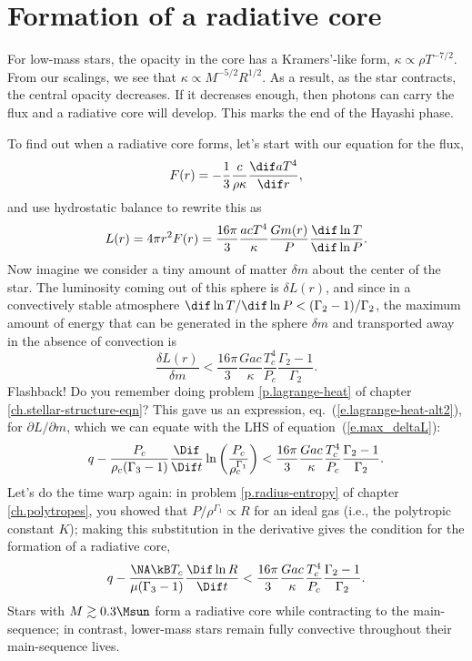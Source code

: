 \section{Formation of a radiative core}

For low-mass stars, the opacity in the core has a Kramers'-like form, $\kappa \propto \rho T^{-7/2}$. From our scalings, we see that $\kappa \propto M^{-5/2} R^{1/2}$.  As a result, as the star contracts, the central opacity decreases.  If it decreases enough, then photons can carry the flux and a radiative core will develop.
This marks the end of the Hayashi phase.

To find out when a radiative core forms, let's start with our equation for the flux,
\[ F(r) = -\frac{1}{3}\frac{c}{\rho\kappa}\frac{\dif aT^{4}}{\dif r}, \]
and use hydrostatic balance to rewrite this as
\[ L(r) = 4\pi r^{2}F(r) = \frac{16\pi}{3}  \frac{acT^{4}}{\kappa} \frac{Gm(r)}{P} \frac{\dif \ln T}{\dif \ln P}. \]
Now imagine we consider a tiny amount of matter $\delta m$ about the center of the star.  The luminosity coming out of this sphere is $\delta L(r)$,  and since in a convectively stable atmosphere $\dif\ln T/\dif\ln P < (\Gamma_{2}-1)/\Gamma_{2}$, the maximum amount of energy that can be generated in the sphere $\delta m$ and transported away in the absence of convection is
\begin{equation}\label{e.max_deltaL}
  \frac{\delta L(r)}{\delta m} < \frac{16\pi}{3} \frac{Gac}{\kappa} \frac{T_{c}^{4}}{P_{c}}  \frac{\Gamma_{2}-1}{\Gamma_{2}}.
\end{equation}
Flashback! Do you remember doing problem \ref{p.lagrange-heat} of chapter \ref{ch.stellar-structure-eqn}? This gave us an expression, eq.~(\ref{e.lagrange-heat-alt2}), for $\partial L/\partial m$, which we can equate with the LHS of equation~(\ref{e.max_deltaL}):
\[
 q - \frac{P_{c}}{\rho_{c}(\Gamma_{3}-1)}\frac{\Dif }{\Dif t}\ln\left(\frac{P_{c}}{\rho_{c}^{\Gamma_{1}}}\right) <
 	\frac{16\pi}{3} \frac{Gac}{\kappa} \frac{T_{c}^{4}}{P_{c}}  \frac{\Gamma_{2}-1}{\Gamma_{2}}.
\]
Let's do the time warp again: in problem \ref{p.radius-entropy} of chapter \ref{ch.polytropes}, you showed that $P/\rho^{\Gamma_{1}} \propto R$ for an ideal gas (i.e., the polytropic constant $K$); making this substitution in the derivative gives the condition for the formation of a radiative core,
\begin{equation}\label{e.formation-radiative-core}
q - \frac{\NA\kB T_{c}}{\mu(\Gamma_{3}-1)} \frac{\Dif \ln R}{\Dif t} < \frac{16\pi}{3} \frac{Gac}{\kappa} \frac{T_{c}^{4}}{P_{c}}  \frac{\Gamma_{2}-1}{\Gamma_{2}}.
\end{equation}
Stars with $M \gtrsim 0.3 \Msun$ form a radiative core while contracting to the main-sequence; in contrast, lower-mass stars remain fully convective throughout their main-sequence lives.

